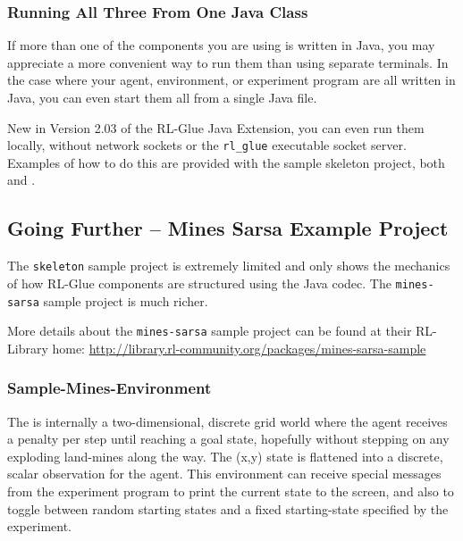 \documentclass[11pt]{article}
\begin{document}
\subsubsection{Running All Three From One Java Class}
\label{all-one-class}
If more than one of the components you are using is written in Java, you may appreciate a more convenient way to run them than using separate terminals.  In the case where your agent, environment, or experiment program are all written in Java, you can even start them all from a single Java file.

New in Version 2.03 of the RL-Glue Java Extension, you can even run them locally, without network sockets or the \texttt{rl\_glue} executable socket server.  Examples of how to do this are provided with the sample skeleton project, both  and .

\subsection{Going Further -- Mines Sarsa Example Project}
\label{mines-sarsa-sample}
The \texttt{skeleton} sample project is extremely limited and only shows the mechanics of how RL-Glue components are structured using the Java codec.  The \texttt{mines-sarsa} sample project is much richer.

More details about the \texttt{mines-sarsa} sample project can be found at their RL-Library home:\newline
\url{http://library.rl-community.org/packages/mines-sarsa-sample}

\subsubsection{Sample-Mines-Environment}
\label{mines-sample}
The 
is internally a two-dimensional, discrete grid world where the agent receives a penalty per step until reaching a goal state, hopefully without stepping on any exploding land-mines along the way.  The (x,y) state is flattened into a discrete, scalar observation for the agent.  This environment can receive special messages from the experiment program to print the current state to the screen, and also to toggle between random starting states and a fixed starting-state specified by the experiment.
\end{document}
